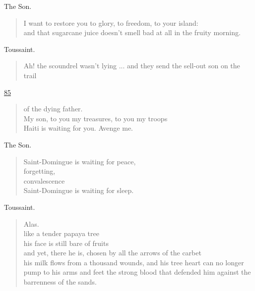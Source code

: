 \documentclass[letterpaper,article,12pt,oneside,notitlepage]{memoir}
\begin{document}
\begin{center}The Son.\end{center}

\begin{verse}
I want to restore you to glory, to freedom, to your island: \\
and that sugarcane juice doesn't smell bad at all in the fruity morning. \\
\end{verse}

\begin{center}Toussaint.\end{center}

\begin{verse}
Ah! the scoundrel wasn't lying ... and they send the sell-out son on the trail \\
\end{verse}

\clearpage

\href{http://cesaire.elotroalex.com/chiens/chiens/p085.html}{85}

\begin{verse}
of the dying father. \\
My son, to you my treasures, to you my troops \\
Haiti is waiting for you. Avenge me. \\
\end{verse}

\begin{center}The Son.\end{center}

\begin{verse}
Saint-Domingue is waiting for peace, \\
forgetting, \\
convalescence \\
Saint-Domingue is waiting for sleep. \\
\end{verse}

\begin{center}Toussaint.\end{center}

\begin{verse}
Alas. \\
like a tender papaya tree \\
his face is still bare of fruits \\
and yet, there he is, chosen by all the arrows of the carbet \\
his milk flows from a thousand wounds, and his tree heart can no longer pump to his arms and feet the strong blood that defended him against the barrenness of the sands. \\
\end{verse}
\end{document}
